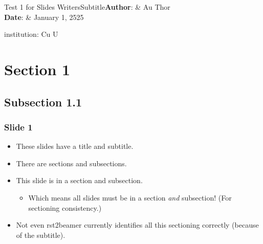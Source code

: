 \documentclass[t,english]{beamer}
\begin{document}
\title{%
  \label{test-1-for-slides-writers}}
\author{}
\date{}
\maketitle
Test 1 for Slides WritersSubtitle\textbf{Author}: &
	Au Thor \\
\textbf{Date}: &
	January 1, 2525 \\
\item[{institution:}]
Cu U




\section*{Section 1}



\subsection*{Subsection 1.1}

\begin{frame}[fragile]
\frametitle{Slide 1}

\begin{itemize}[<+-| alert@+>]

\item These slides have a title and subtitle.

\item There are sections and subsections.

\item This slide is in a section and subsection.
\begin{itemize}[<+-| alert@+>]

\item Which means all slides must be in a section
\emph{and} subsection! (For sectioning consistency.)
\end{itemize}

\item Not even rst2beamer currently identifies all this
sectioning correctly (because of the subtitle).
\end{itemize}
\end{frame}


\end{document}
